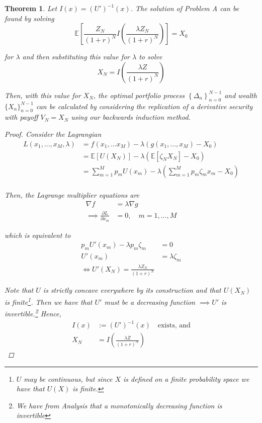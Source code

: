 \documentclass[12pt]{article}
\newtheorem{theorem}{Theorem}
\newlength\tindent
\renewcommand{\indent}{\hspace*{\tindent}}
\newcommand{\E}{\mathbb E}
\begin{document}
\begin{theorem} Let $I(x) = \left( U' \right)^{-1}(x)$. The solution of Problem A can be found by solving
\begin{equation*}
	\E \left[ \frac{Z_N}{(1 + r)^N} I \left( \frac{ \lambda Z_N }{(1 + r)^N} \right) \right] = X_0
\end{equation*}

for $\lambda$ and then substituting this value for $\lambda$ to solve
\begin{equation*}
	X_N = I \left( \frac{\lambda Z}{(1 + r)^N} \right)
\end{equation*}

\indent Then, with this value for $X_N$, the optimal portfolio process $\left\{\Delta_n\right\}^{N - 1}_{n = 0}$ and wealth $\{X_n\}^{N - 1}_{n = 0}$ can be calculated by considering the replication of a derivative security with payoff $V_N = X_N$ using our backwards induction method.

\begin{proof} Consider the Lagrangian
\begin{align*}
	L(x_1, ..., x_M, \lambda) &= f(x_1, ... x_M) - \lambda(g(x_1,..., x_M) - X_0) \\
	&= \E[U(X_N)] - \lambda\left(\E[\zeta_N X_N] - X_0 \right) \\
	&= \sum^M_{m = 1} p_mU(x_m) - \lambda \left( \sum^M_{m = 1} p_m\zeta_mx_m - X_0 \right) \\
\end{align*}

Then, the Lagrange multiplier equations are
\begin{align*}
	\nabla f &= \lambda \nabla g \\
	\implies \frac{ \partial L }{ \partial x_m } &= 0, \quad m = 1, ..., M 
\end{align*}

which is equivalent to
\begin{align*}
	p_m U'(x_m) - \lambda p_m \zeta_m &= 0 \\
	U'(x_m) &= \lambda\zeta_m \\
	\iff U'\left( X_N \right) = \frac{\lambda Z_N }{(1 + r)^N}
\end{align*}

\indent Note that $U$ is strictly concave everywhere by its construction and that $U(X_N)$ is finite\footnote{$U$ may be continuous, but since $X$ is defined on a finite probability space we have that $U(X)$ is finite.}. Then we have that $U'$ must be a decreasing function $\implies U'$ is invertible.\footnote{We have from Analysis that a monotonically decreasing function is invertible} Hence,
\begin{align*}
	I(x) &:= \left( U' \right)^{-1}(x) \quad \text{exists, and} \\
	X_N &= I \left( \frac{\lambda Z}{(1 + r)^N} \right)
\end{align*}


\end{proof}
\end{theorem}
\end{document}
